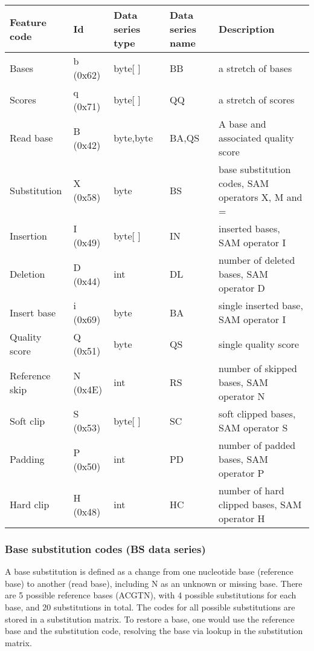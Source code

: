 \documentclass[a4paper]{article}
\begin{document}
\begin{tabular}{|>{\raggedright}p{91pt}|>{\raggedright}p{45pt}|>{\raggedright}p{72pt}|>{\raggedright}p{66pt}|>{\raggedright}p{132pt}|}
\hline
\textbf{Feature code} & \textbf{Id} & \textbf{Data series type} & \textbf{Data 
series name} & \textbf{Description}\tabularnewline
\hline
Bases & b (0x62) & byte[ ] & BB & a stretch of bases\tabularnewline
\hline
Scores & q (0x71) & byte[ ] & QQ & a stretch of scores\tabularnewline
\hline
%
Read base & B (0x42) & byte,byte & BA,QS & A base and associated quality score\tabularnewline
\hline
Substitution & X (0x58) & byte & BS & base substitution codes, SAM operators X, 
M and =\tabularnewline
\hline
Insertion & I (0x49) & byte[ ] & IN & inserted bases, SAM operator I\tabularnewline
\hline
Deletion & D (0x44) & int & DL & number of deleted bases, SAM operator D\tabularnewline
\hline
Insert base & i (0x69) & byte & BA & single inserted base, SAM operator I\tabularnewline
\hline
Quality score & Q (0x51) & byte & QS & single quality score\tabularnewline
\hline
Reference skip & N (0x4E) & int & RS & number of skipped bases, SAM operator N\tabularnewline
\hline
Soft clip & S (0x53) & byte[ ] & SC & soft clipped bases, SAM operator S\tabularnewline
\hline
Padding & P (0x50) & int & PD & number of padded bases, SAM operator P\tabularnewline
\hline
Hard clip & H (0x48) & int & HC & number of hard clipped bases, SAM operator H\tabularnewline
\hline
\end{tabular}

\subsubsection*{Base substitution codes (BS data series)}

A base substitution is defined as a change from one nucleotide base (reference base) to
another (read base), including N as an unknown or missing base. There are 5 possible reference
bases (ACGTN), with 4 possible substitutions for each base, and 20 substitutions in total.
The codes for all possible substitutions are stored in a substitution matrix. To restore a
base, one would use the reference base and the substitution code, resolving the base via lookup
in the substitution matrix.
\end{document}
